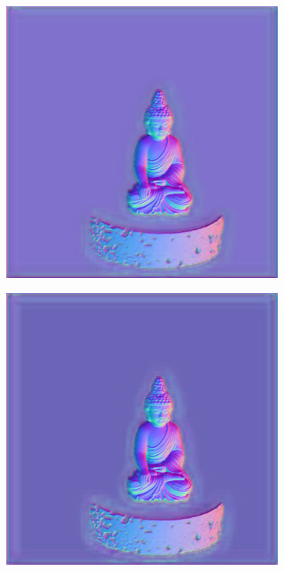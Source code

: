 \begin{figure}[th]
\begin{subfigure}[b]{0.2\linewidth}
	\end{subfigure}
	\begin{subfigure}[b]{0.2\linewidth}
		\includegraphics[width=\linewidth]{./Figures/comparison_real/fancy_eval_0_normal_NNNN-512.png}
	\end{subfigure}
	\begin{subfigure}[b]{0.2\linewidth}
		\includegraphics[width=\linewidth]{./Figures/comparison_real/fancy_eval_0_normal_An2-real-resume.png}
	\end{subfigure}
	

\end{figure}
